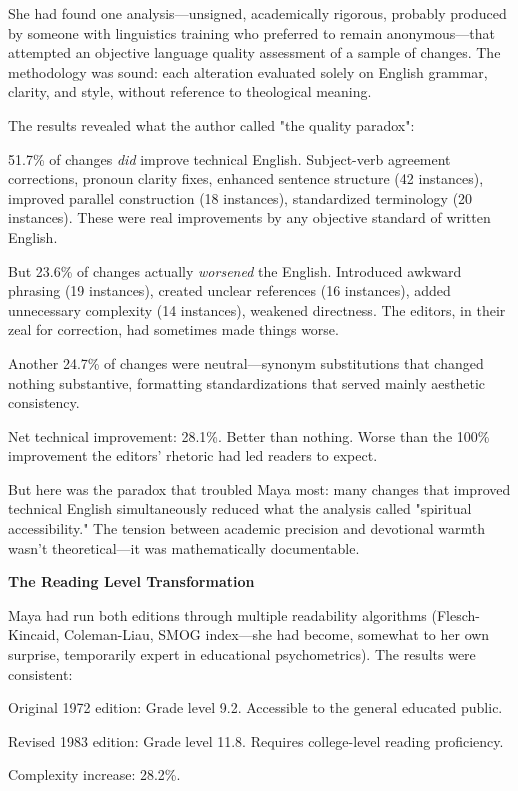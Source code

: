 \documentclass[12pt,twoside]{book}
\begin{document}
She had found one analysis—unsigned, academically rigorous, probably produced by someone with linguistics training who preferred to remain anonymous—that attempted an objective language quality assessment of a sample of changes. The methodology was sound: each alteration evaluated solely on English grammar, clarity, and style, without reference to theological meaning.

The results revealed what the author called "the quality paradox":

51.7\% of changes \emph{did} improve technical English. Subject-verb agreement corrections, pronoun clarity fixes, enhanced sentence structure (42 instances), improved parallel construction (18 instances), standardized terminology (20 instances). These were real improvements by any objective standard of written English.

But 23.6\% of changes actually \emph{worsened} the English. Introduced awkward phrasing (19 instances), created unclear references (16 instances), added unnecessary complexity (14 instances), weakened directness. The editors, in their zeal for correction, had sometimes made things worse.

Another 24.7\% of changes were neutral—synonym substitutions that changed nothing substantive, formatting standardizations that served mainly aesthetic consistency.

Net technical improvement: 28.1\%. Better than nothing. Worse than the 100\% improvement the editors' rhetoric had led readers to expect.

But here was the paradox that troubled Maya most: many changes that improved technical English simultaneously reduced what the analysis called "spiritual accessibility." The tension between academic precision and devotional warmth wasn't theoretical—it was mathematically documentable.

\textbf{\textbf{The Reading Level Transformation}}

Maya had run both editions through multiple readability algorithms (Flesch-Kincaid, Coleman-Liau, SMOG index—she had become, somewhat to her own surprise, temporarily expert in educational psychometrics). The results were consistent:

Original 1972 edition: Grade level 9.2. Accessible to the general educated public.

Revised 1983 edition: Grade level 11.8. Requires college-level reading proficiency.

Complexity increase: 28.2\%.
\end{document}
